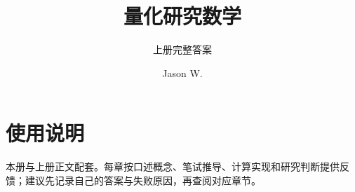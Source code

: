 \documentclass[lang=cn,11pt,scheme=chinese]{elegantbook}
\title{量化研究数学}
\subtitle{上册完整答案}
\author{Jason W.}
\date{\MFQReleaseDate}
\begin{document}
\maketitle
\frontmatter

\chapter*{使用说明}
本册与上册正文配套。每章按口述概念、笔试推导、计算实现和研究判断提供反馈；建议先记录自己的答案与失败原因，再查阅对应章节。

\tableofcontents
\mainmatter


















\end{document}
